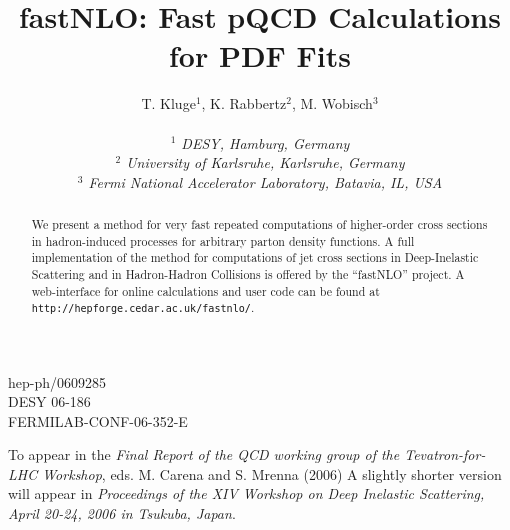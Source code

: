 \documentclass[12pt]{article}
\begin{document}
\title{\bf fastNLO: Fast pQCD Calculations \\ for PDF Fits}
\author{T. Kluge$^1$, K. Rabbertz$^2$, M. Wobisch$^3$\\ \, \\
\em     $^1$ DESY, Hamburg, Germany
  \\\em$^2$ University of Karlsruhe, Karlsruhe, Germany
  \\\em$^3$ Fermi National Accelerator Laboratory, Batavia, IL, USA}

\maketitle

\begin{abstract}
We present a method for very fast repeated computations of higher-order
cross sections in hadron-induced processes
for arbitrary parton density functions.
A full implementation of the method
for computations of jet cross sections
in Deep-Inelastic Scattering and in Hadron-Hadron Collisions
is offered by the ``fastNLO'' project.  
A web-interface for online calculations and user code
can be found at
{\tt http://hepforge.cedar.ac.uk/fastnlo/}.
\end{abstract}

\vskip-13.8cm
\hfill {hep-ph/0609285} \\
\phantom{a} \hfill{DESY 06-186}  \\
\phantom{a} \hfill{FERMILAB-CONF-06-352-E} \\


\vskip18cm

\noindent
To appear in the
{\sl Final Report of the QCD working group of the Tevatron-for-LHC Workshop}, 
eds. M. Carena and S. Mrenna (2006)
\vskip2mm
\noindent
A slightly shorter version will appear in
{\sl Proceedings of the XIV Workshop on Deep Inelastic Scattering, 
April 20-24, 2006 in Tsukuba, Japan}.




\newpage


\end{document}

